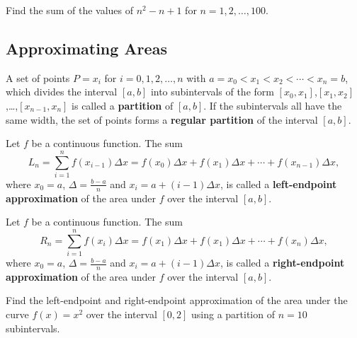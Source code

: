 \begin{example}

Find the sum of the values of \(n^2-n+1\) for \(n=1,2, \dots ,100\).

\end{example}
\vspace*{6\baselineskip}

\hypertarget{approximating-areas}{%
\subsection{Approximating Areas}\label{approximating-areas}}

\begin{definition}

A set of points \(P={x_i}\) for \(i=0,1,2, \dots ,n\) with
\(a=x_0<x_1<x_2< \cdots <x_n=b\), which divides the interval \([a,b]\) into
subintervals of the form
\([x_0,x_1]\),\([x_1,x_2]\),\ldots,\([x_{n - 1},x_n]\) is called a
\textbf{partition} of \([a,b]\). If the subintervals all have the same
width, the set of points forms a \textbf{regular partition} of the
interval \([a,b]\).

\end{definition}

\begin{definition}

Let \(f\) be a continuous function. The sum
\[L_n=\sum\limits_{i=1}^nf(x_{i - 1})\Delta x=f(x_0)\Delta x+f(x_1)\Delta x+\cdots+f(x_{n - 1})\Delta x,\]
where \(x_0=a\), \(\Delta=\frac{b-a}{n}\) and \(x_i=a+(i-1)\Delta x\),
is called a \textbf{left-endpoint approximation} of the area under \(f\)
over the interval \([a,b]\).

Let \(f\) be a continuous function. The sum
\[R_n=\sum\limits_{i=1}^nf(x_{i})\Delta x=f(x_1)\Delta x+f(x_1)\Delta x+\cdots+f(x_{n})\Delta x,\]
where \(x_0=a\), \(\Delta=\frac{b-a}{n}\) and \(x_i=a+(i-1)\Delta x\),
is called a \textbf{right-endpoint approximation} of the area under
\(f\) over the interval \([a,b]\).


\end{definition}

\begin{example}

Find the left-endpoint and right-endpoint approximation of the area
under the curve \(f(x)=x^2\) over the interval \([0, 2]\) using a
partition of \(n=10\) subintervals.

\end{example}
\vspace*{6\baselineskip}

